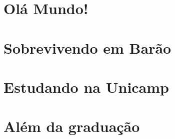 \documentclass[a4paper,10pt]{book}
\begin{document}
\tableofcontents

\mainmatter
\chapter{Olá Mundo!}


\clearpage


\clearpage


\clearpage

\twocolumn


\chapter{Sobrevivendo em Barão}

\newpage

\newpage

\newpage

\newpage


\chapter{Estudando na Unicamp}

\newpage

\newpage

\newpage

\newpage

\newpage

\newpage

\newpage

\newpage


\chapter{Além da graduação}

\newpage

\newpage

\newpage

\newpage

\newpage

\newpage

\newpage

\end{document}
